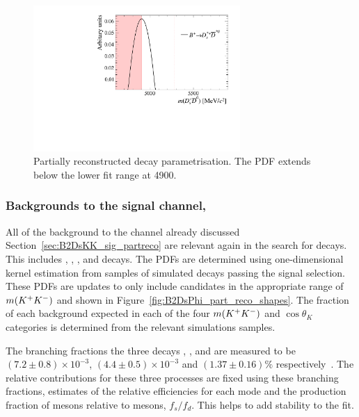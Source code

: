 \begin{figure}[!h]
    \centering
    \includegraphics[width=0.70\textwidth]{figs/B2DsPhi/DsstarDstar0_part_reco_Shapes.pdf}
    \caption{Partially reconstructed \decay{\Bp}{\Dssp\Dstarzb} decay parametrisation. The PDF extends below the lower fit range at 4900\mevcc.}
    \label{fig:B2DsPhi_DsstarDstar0_partreco}   
\end{figure}



\subsubsection{Backgrounds to the signal channel, \decay{\Bp}{\Dsp\phiz}}
\label{sec:B2DsPhi_part_recto_sig}

All of the background to the \decay{\Bp}{\Dsp\Kp\Km} channel already discussed Section~\ref{sec:B2DsKK_sig_partreco} are relevant again in the search for \decay{\Bp}{\Dsp\phiz} decays. This includes \decay{\Bsb}{\Dsp\Km\Kstarz}, \decay{\Bsb}{\Dssp\Km\Kstarz}, \decay{\Bsb}{\Dsp\Dsm}, \decay{\Bzb}{\Dsp\Dm} and \decay{\Bsb}{\Dssp\Dsm} decays. The PDFs are determined using one-dimensional kernel estimation from samples of simulated decays passing the signal selection. These PDFs are updates to only include candidates in the appropriate range of $m({{K}^+}{{K}^-})$ and shown in Figure~\ref{fig:B2DsPhi_part_reco_shapes}. The fraction of each background expected in each of the four $m({{K}^+}{{K}^-})$ and $\cos\theta_{K}$ categories is determined from the relevant simulations samples.

The branching fractions the three decays \decay{\Bzb}{\Dsp\Dm}, \decay{\Bsb}{\Dsp\Dsm}, and \decay{\Bsb}{\Dssp\Dsm} are measured to be $(7.2 \pm 0.8 ) \times 10^{-3}$, $(4.4 \pm 0.5 ) \times 10^{-3}$ and $(1.37 \pm 0.16 ) \%$ respectively~\cite{PDG2016}. The relative contributions for these three processes are fixed using these branching fractions, estimates of the relative efficiencies for each mode and the production fraction of \Bsb mesons relative to \Bzb mesons, $f_{s}/f_{d}$. This helps to add stability to the fit.


